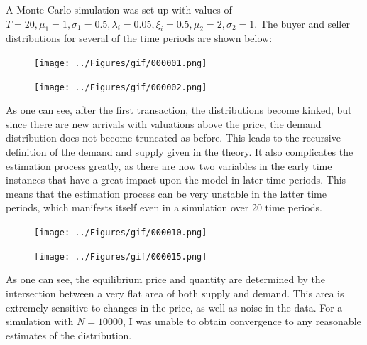 \documentclass[12pt, letterpaper]{paper}
\begin{document}
A Monte-Carlo simulation was set up with values of $T = 20, \mu_1 = 1, \sigma_1 =
0.5, \lambda_i = 0.05, \xi_i = 0.5, \mu_2 = 2, \sigma_2 = 1$. The buyer and seller
distributions for several of the time periods are shown below:

\begin{figure}
\centering
\begin{minipage}{.5\textwidth}
  \centering
  \texttt{[image: ../Figures/gif/000001.png]}
  \label{fig:test1}
\end{minipage}%
\begin{minipage}{.5\textwidth}
  \centering
  \texttt{[image: ../Figures/gif/000002.png]}
  \label{fig:test2}
\end{minipage}
\end{figure}

As one can see, after the first transaction, the distributions become
kinked, but since there are new arrivals with valuations above the
price, the demand distribution does not become truncated as
before. This leads to the recursive definition of the demand and
supply given in the theory. It also complicates the
estimation process greatly, as there are now two variables in the
early time instances that have a great impact upon the model in later
time periods. This means that the estimation process can be very
unstable in the latter time periods, which manifests itself even in a
simulation over 20 time periods.

\begin{figure}
\centering
\begin{minipage}{.5\textwidth}
  \centering
  \texttt{[image: ../Figures/gif/000010.png]}
  \label{fig:test3}
\end{minipage}%
\begin{minipage}{.5\textwidth}
  \centering
  \texttt{[image: ../Figures/gif/000015.png]}
  \label{fig:test4}
\end{minipage}
\end{figure}

As one can see, the equilibrium price and quantity are determined by
the intersection between a very flat area of both supply and
demand. This area is extremely sensitive to changes in the price, as
well as noise in the data. For a simulation with $N = 10000$, I was
unable to obtain convergence to any reasonable estimates of the
distribution.
\end{document}
